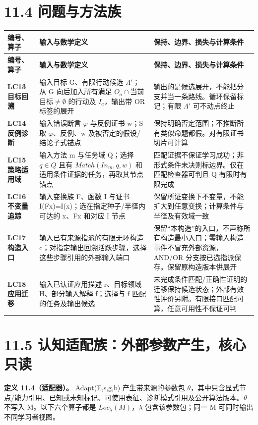 \documentclass[UTF8,a4paper,zihao=-4,fontset=windows,openany]{ctexbook}
\def\mathrm#1{#1}%
\begin{document}
\section{11.4 问题与方法族}
\begingroup\small\setlength{\tabcolsep}{4pt}
\begin{longtable}{>{\raggedright\arraybackslash}p{}>{\raggedright\arraybackslash}p{}>{\raggedright\arraybackslash}p{}}
\toprule
\textbf{编号、算子} & \textbf{输入与数学定义} & \textbf{保持、边界、损失与计算条件} \\
\midrule
\endfirsthead
\toprule
\textbf{编号、算子} & \textbf{输入与数学定义} & \textbf{保持、边界、损失与计算条件} \\
\midrule
\endhead
\bottomrule
\endfoot
\bottomrule
\endlastfoot
\textbf{LC13 目标回溯} & 输入目标 G、有限行动候选 \(\Lambda'\)；从 G 向后加入所有满足 \(O_a\cap\)当前目标\(\ne\emptyset\) 的行动及 \(I_a\)，输出带 OR 标签的展开 & 输出的是候选展开，不能把分支并当一条路线。循环保留标记；有限 \(\Lambda'\) 可不动点终止 \\
\textbf{LC14 反例诊断} & 输入错误断言 \(\varphi\) 与反例证书 w；S 取 \(\varphi\)、反例、w 及被否定的假设/结论子式锚点 & 保持明确否定范围；不推断所有类似命题都假。对有限证书切片可计算 \\
\textbf{LC15 策略适用域} & 输入方法 m 与任务域 Q；选择 \(q\in Q\) 且有 \(\mathrm{Match}(\mathrm{In}_m,q,w)\) 和适用条件证据的任务，再取其节点锚点 & 匹配证据不保证学习成功；非形式条件未决则标边界。仅在匹配检查器可判且 Q 有限时有限完成 \\
\textbf{LC16 不变量追踪} & 输入变换族 F、函数 I 与证书 I(Fx)=I(x)；选在指定种子/半径内可达的 x、Fx 和对应 I 节点 & 保留所证变换下不变量，不能扩大到任意变换；计算条件与半径及有效域一致 \\
\textbf{LC17 构造入口} & 输入已有来源指派的有限无环构造 c；对指定输出回溯活跃步骤，选择这些步骤引用的外部输入端口 & 保留“本构造”的入口，不声称所有构造最小入口；零输入构造事件不冒充外部资源，AND/OR 分支按已选指派保存。保留原构造版本供展开 \\
\textbf{LC18 应用迁移} & 输入已认证应用描述 r、目标领域 H、部分输入解释 f；选择与 f 匹配的任务及输出候选 & 未完成条件匹配/正确性证明的迁移保持候选状态；外部有效性评价另附。有限接口匹配可算，任意可用性不保证可判 \\
\end{longtable}
\endgroup

\section{11.5 认知适配族：外部参数产生，核心只读}
\textbf{定义 11.4（适配器）。} Adapt(E,s,g,b) 产生带来源的参数包 \(\theta\)，其中只含显式节点/能力引用、已知或未知标记、可使用表征、诊断模式引用及公开算法版本。\(\theta\) 不写入 M。以下六个算子都是 \(\mathrm{Loc}_\lambda(M)\)，\(\lambda\) 包含该参数包；同一 M 可同时输出不同学习者视图。
\end{document}
